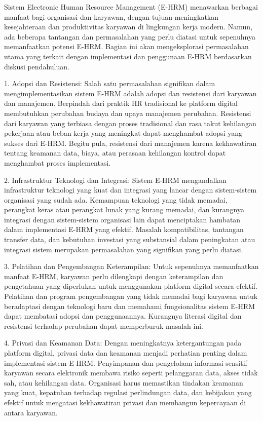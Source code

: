 \documentclass{article}
\begin{document}
Sistem Electronic Human Resource Management (E-HRM) menawarkan berbagai manfaat bagi organisasi dan karyawan, dengan tujuan meningkatkan kesejahteraan dan produktivitas karyawan di lingkungan kerja modern. Namun, ada beberapa tantangan dan permasalahan yang perlu diatasi untuk sepenuhnya memanfaatkan potensi E-HRM. Bagian ini akan mengeksplorasi permasalahan utama yang terkait dengan implementasi dan penggunaan E-HRM berdasarkan diskusi pendahuluan.

1. Adopsi dan Resistensi:
Salah satu permasalahan signifikan dalam mengimplementasikan sistem E-HRM adalah adopsi dan resistensi dari karyawan dan manajemen. Berpindah dari praktik HR tradisional ke platform digital membutuhkan perubahan budaya dan upaya manajemen perubahan. Resistensi dari karyawan yang terbiasa dengan proses tradisional dan rasa takut kehilangan pekerjaan atau beban kerja yang meningkat dapat menghambat adopsi yang sukses dari E-HRM. Begitu pula, resistensi dari manajemen karena kekhawatiran tentang keamanan data, biaya, atau perasaan kehilangan kontrol dapat menghambat proses implementasi.

2. Infrastruktur Teknologi dan Integrasi:
Sistem E-HRM mengandalkan infrastruktur teknologi yang kuat dan integrasi yang lancar dengan sistem-sistem organisasi yang sudah ada. Kemampuan teknologi yang tidak memadai, perangkat keras atau perangkat lunak yang kurang memadai, dan kurangnya integrasi dengan sistem-sistem organisasi lain dapat menciptakan hambatan dalam implementasi E-HRM yang efektif. Masalah kompatibilitas, tantangan transfer data, dan kebutuhan investasi yang substansial dalam peningkatan atau integrasi sistem merupakan permasalahan yang signifikan yang perlu diatasi.

3. Pelatihan dan Pengembangan Keterampilan:
Untuk sepenuhnya memanfaatkan manfaat E-HRM, karyawan perlu dilengkapi dengan keterampilan dan pengetahuan yang diperlukan untuk menggunakan platform digital secara efektif. Pelatihan dan program pengembangan yang tidak memadai bagi karyawan untuk beradaptasi dengan teknologi baru dan memahami fungsionalitas sistem E-HRM dapat membatasi adopsi dan penggunaannya. Kurangnya literasi digital dan resistensi terhadap perubahan dapat memperburuk masalah ini.

4. Privasi dan Keamanan Data:
Dengan meningkatnya ketergantungan pada platform digital, privasi data dan keamanan menjadi perhatian penting dalam implementasi sistem E-HRM. Penyimpanan dan pengelolaan informasi sensitif karyawan secara elektronik membawa risiko seperti pelanggaran data, akses tidak sah, atau kehilangan data. Organisasi harus memastikan tindakan keamanan yang kuat, kepatuhan terhadap regulasi perlindungan data, dan kebijakan yang efektif untuk mengatasi kekhawatiran privasi dan membangun kepercayaan di antara karyawan.
\end{document}
